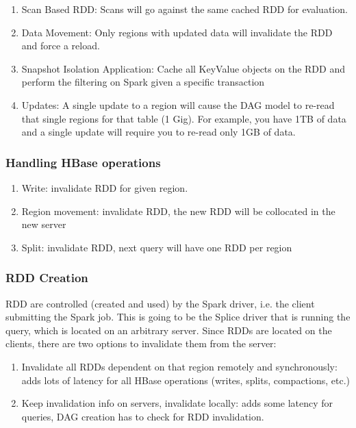 \begin{enumerate}
	\item Scan Based RDD: Scans will go against the same cached RDD for evaluation.
	\item Data Movement: Only regions with updated data will invalidate the RDD and
	force a reload.
	\item Snapshot Isolation Application: Cache all KeyValue objects on the RDD and 
	perform the filtering on Spark given a specific transaction
	\item Updates:  A single update to a region will cause the DAG model to re-read
	that single regions for that table (1 Gig).  For example, you have 1TB of data
	and a single update will require you to re-read only 1GB of data.
\end{enumerate}
        

\subsubsection{Handling HBase operations}

\begin{enumerate}
	\item Write: invalidate RDD for given region.
	\item Region movement: invalidate RDD, the new RDD will be collocated 
	in the new server
	\item Split: invalidate RDD, next query will have one RDD per region
\end{enumerate}
        
        
\subsubsection{RDD Creation}

RDD are controlled (created and used) by the Spark driver, i.e. the client submitting the 
Spark job. This is going to be the Splice driver that is running the query, which is located 
on an arbitrary server.
Since RDDs are located on the clients, there are two options to invalidate them from the server:

 \begin{enumerate}
	\item Invalidate all RDDs dependent on that region remotely and synchronously: 
	adds lots of latency for all HBase operations (writes, splits, compactions, etc.)
	\item Keep invalidation info on servers, invalidate locally: adds some latency for queries,
	DAG creation has to check for RDD invalidation. 
\end{enumerate}
        
